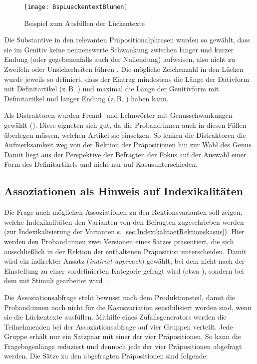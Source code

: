 \begin{figure}
\centering
\texttt{[image: BspLueckentextBlumen]}
\caption{Beispiel zum Ausfüllen der Lückentexte}
\label{pic:BspLUE}
\end{figure}

Die Substantive in den relevanten Präpositionalphrasen wurden so gewählt, dass sie im Genitiv keine nennenswerte Schwankung zwischen langer und kurzer Endung (oder gegebenenfalls auch der Nullendung) aufweisen, also nicht zu Zweifeln oder Unsicherheiten führen \citep[zu Zweifelsfällen bei Genitivendungen s. etwa][]{Szczepaniak2014}. Die mögliche Zeichenzahl in den Lücken wurde jeweils so definiert, dass der Eintrag mindestens die Länge der Dativform mit Definitartikel (z.\,B. ) und maximal die Länge der Genitivform mit Definitartikel und langer Endung (z.\,B. ) haben kann. 

Als Distraktoren wurden Fremd- und Lehnwörter mit Genusschwankungen gewählt (). Diese eigneten sich gut, da die Proband:innen auch in diesen Fällen überlegen müssen, welchen Artikel sie einsetzen. So lenken die Distraktoren die Aufmerksamkeit weg von der Rektion der Präpositionen hin zur Wahl des Genus. Damit liegt aus der Perspektive der Befragten der Fokus auf der Auswahl einer Form des Definitartikels und nicht nur auf Kasusunterschieden. 
\subsection{Assoziationen als Hinweis auf Indexikalitäten} 
\label{sec:Ass}
Die Frage nach möglichen Assoziationen zu den Rektionsvarianten soll zeigen, welche Indexikalitäten den Varianten von den Befragten zugeschrieben werden (zur Indexikalisierung der Varianten s. \autoref{sec:IndexikalitaetRektionskasus}). 
Hier werden den Proband:innen zwei Versionen eines Satzes präsentiert, die sich ausschließlich in der Rektion der enthaltenen Präposition unterscheiden. 
Damit wird ein indirekter Ansatz (\textit{indirect approach}) gewählt, bei dem nicht nach der Einstellung zu einer vordefinierten Kategorie gefragt wird (etwa ), sondern bei dem mit Stimuli gearbeitet wird~\citep[s.][1251--1252]{Garrett2005}. 

Die Assoziationsabfrage steht bewusst nach dem Produktionsteil, damit die Proband:innen noch nicht für die Kasusvariation sensibilisiert worden sind, wenn sie die Lückentexte ausfüllen.
Mithilfe eines Zufallsgenerators werden die Teilnehmenden bei der Assoziationsabfrage auf vier Gruppen verteilt. 
Jede Gruppe erhält nur ein Satzpaar mit einer der vier Präpositionen. 
So kann die Fragebogenlänge reduziert und dennoch jede der vier Präpositionen abgefragt werden. 
Die Sätze zu den abgefragten Präpositionen sind folgende: 

